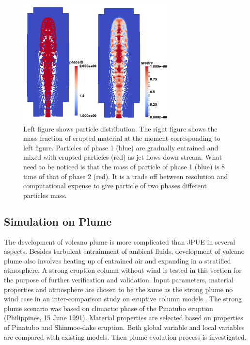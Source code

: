 \documentclass[journal abbreviation, manuscript]{copernicus}
\begin{document}
\begin{figure}
\includegraphics[width=8cm]{JPUE_entrainment.png}
\caption{Left figure shows particle distribution. The right figure shows the mass fraction of erupted material at the moment corresponding to left figure. Particles of phase 1 (blue) are gradually entrained and mixed with erupted particles (red) as jet flows down stream. What need to be noticed is that the mass of particle of phase 1 (blue) is 8 time of that of phase 2 (red). It is a trade off between resolution and computational expense to give particle of two phases different particles mass.}
\label{fig:Turb_mixing}
\end{figure}
\subsection{Simulation on Plume}
The development of volcano plume is more complicated than JPUE in several aspects. Besides turbulent entrainment of ambient fluids, development of volcano plume also involves heating up of entrained air and expanding in a stratified atmosphere. A strong eruption column without wind is tested in this section for the purpose of further verification and validation. Input parameters, material properties and atmosphere are chosen to be the same as the strong plume no wind case in an inter-comparison study on eruptive column models \citep{costa2016results}. The strong plume scenario was based on climactic phase of the Pinatubo eruption (Philippines, 15 June 1991). Material properties are selected based on properties of Pinatubo and Shinmoe-dake eruption. Both global variable and local variables are compared with existing models. Then plume evolution process is investigated.  
\end{document}
